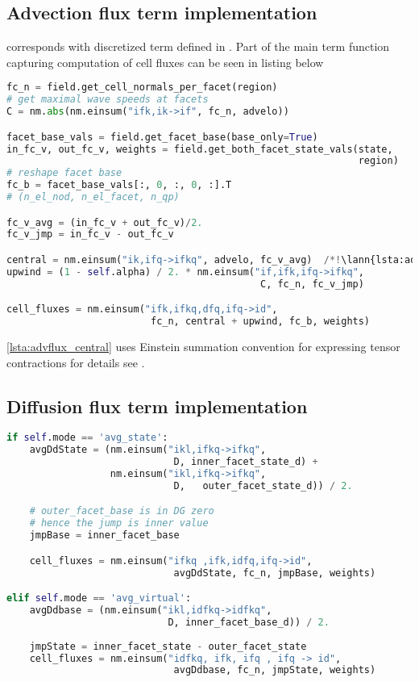 \subsection{Advection flux term implementation}
\label{se:adv_flux_term_imp}
 corresponds with discretized term defined in 
. Part of the main term function capturing computation of cell 
fluxes can be seen in listing below
\setcounter{lstannotation}{0}
\begin{lstlisting}[language=Python, caption=Computation of advection cell 
fluxes]
fc_n = field.get_cell_normals_per_facet(region)
# get maximal wave speeds at facets
C = nm.abs(nm.einsum("ifk,ik->if", fc_n, advelo))

facet_base_vals = field.get_facet_base(base_only=True)
in_fc_v, out_fc_v, weights = field.get_both_facet_state_vals(state,
                                                             region)
# reshape facet base
fc_b = facet_base_vals[:, 0, :, 0, :].T
# (n_el_nod, n_el_facet, n_qp)

fc_v_avg = (in_fc_v + out_fc_v)/2.
fc_v_jmp = in_fc_v - out_fc_v

central = nm.einsum("ik,ifq->ifkq", advelo, fc_v_avg)  /*!\lann{lsta:advflux_central}!*/
upwind = (1 - self.alpha) / 2. * nm.einsum("if,ifk,ifq->ifkq",
                                            C, fc_n, fc_v_jmp)

cell_fluxes = nm.einsum("ifk,ifkq,dfq,ifq->id",
                         fc_n, central + upwind, fc_b, weights)
\end{lstlisting}
\ref{lsta:advflux_central}  uses Einstein summation convention for 
expressing tensor contractions for details see \cite{einsum-doc}.




\subsection{Diffusion flux term implementation}
\label{se:diff_flux_term_imp}

\begin{lstlisting}[language=Python, caption=Computation of diffusion cell 
fluxes]
if self.mode == 'avg_state':
	avgDdState = (nm.einsum("ikl,ifkq->ifkq",
							 D, inner_facet_state_d) +
				  nm.einsum("ikl,ifkq->ifkq",
		     				 D,   outer_facet_state_d)) / 2.

	# outer_facet_base is in DG zero 
	# hence the jump is inner value
	jmpBase = inner_facet_base

	cell_fluxes = nm.einsum("ifkq ,ifk,idfq,ifq->id",
						 	 avgDdState, fc_n, jmpBase, weights)

elif self.mode == 'avg_virtual':
	avgDdbase = (nm.einsum("ikl,idfkq->idfkq",
							D, inner_facet_base_d)) / 2.
	
	jmpState = inner_facet_state - outer_facet_state
	cell_fluxes = nm.einsum("idfkq, ifk, ifq , ifq -> id",
							 avgDdbase, fc_n, jmpState, weights)

\end{lstlisting}


